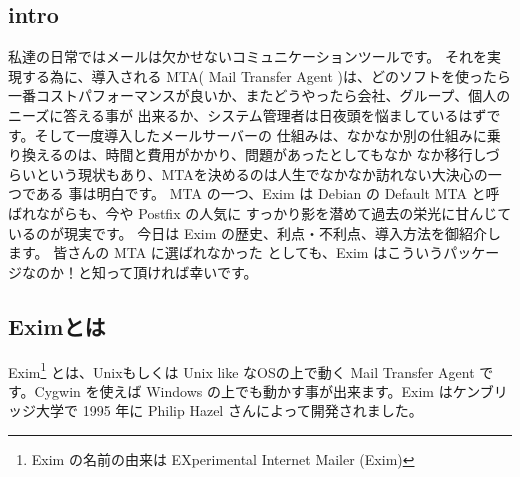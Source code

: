 \documentclass[mingoth,a4paper]{jsarticle}
\begin{document}
\subsection{intro}
私達の日常ではメールは欠かせないコミュニケーションツールです。
それを実現する為に、導入される MTA( Mail Transfer Agent )は、どのソフトを使ったら
一番コストパフォーマンスが良いか、またどうやったら会社、グループ、個人のニーズに答える事が
出来るか、システム管理者は日夜頭を悩ましているはずです。そして一度導入したメールサーバーの
仕組みは、なかなか別の仕組みに乗り換えるのは、時間と費用がかかり、問題があったとしてもなか
なか移行しづらいという現状もあり、MTAを決めるのは人生でなかなか訪れない大決心の一つである
事は明白です。
MTA の一つ、Exim は Debian の Default MTA と呼ばれながらも、今や Postfix の人気に
すっかり影を潜めて過去の栄光に甘んじているのが現実です。
今日は Exim の歴史、利点・不利点、導入方法を御紹介します。 皆さんの MTA に選ばれなかった
としても、Exim はこういうパッケージなのか！と知って頂ければ幸いです。

\subsection{Eximとは}
Exim\footnote{Exim の名前の由来は EXperimental Internet Mailer (Exim)}
 とは、Unixもしくは Unix like なOSの上で動く Mail Transfer Agent です。Cygwin 
を使えば Windows の上でも動かす事が出来ます。Exim はケンブリッジ大学で 1995 年に Philip Hazel 
さんによって開発されました。\\
\end{document}
